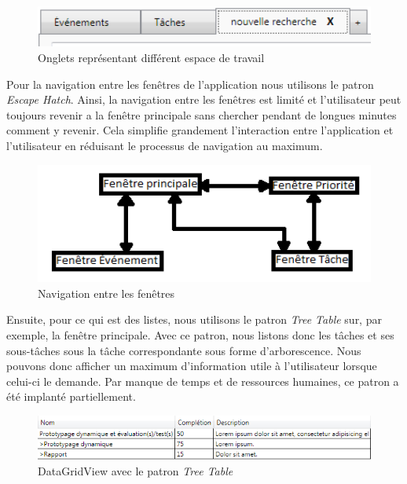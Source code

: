 \documentclass[letterpaper, oneside, 12pt, these, creativecommons]{thETS}
\begin{document}
\begin{figure}[H!]
	\centering
	\includegraphics[width=1\textwidth]{many_workspaces.png}
	\caption{Onglets représentant différent espace de travail}
\end{figure}

Pour la navigation entre les fenêtres de l'application nous utilisons le patron \emph{Escape Hatch}. Ainsi, la navigation entre les fenêtres est limité et l'utilisateur peut toujours revenir a la fenêtre principale sans chercher pendant de longues minutes comment y revenir. Cela simplifie grandement l'interaction entre l'application et l'utilisateur en réduisant le processus de navigation au maximum.

\begin{figure}[H!]
	\centering
	\includegraphics[width=1\textwidth]{navigation.png}
	\caption{Navigation entre les fenêtres}
\end{figure}

\newpage

Ensuite, pour ce qui est des listes, nous utilisons le patron \emph{Tree Table} sur, par exemple, la fenêtre principale. Avec ce patron, nous listons donc les tâches et ses sous-tâches sous la tâche correspondante sous forme d'arborescence. Nous pouvons donc afficher un maximum d'information utile à l'utilisateur lorsque celui-ci le demande. Par manque de temps et de ressources humaines, ce patron a été implanté partiellement.

\begin{figure}[H!]
	\centering
	\includegraphics[width=1\textwidth]{tree_table.png}
	\caption{DataGridView avec le patron \emph{Tree Table}}
\end{figure}
\end{document}
